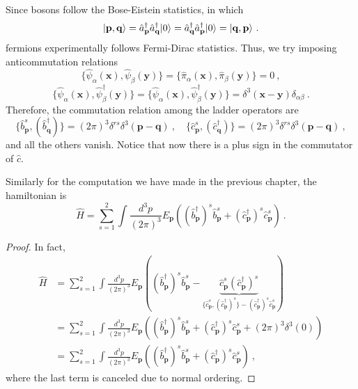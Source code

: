     Since bosons follow the Bose-Eistein statistics, in which 
    \begin{equation*}
        \vert\mathbf p, \mathbf q\rangle = \hat a^\dagger_{\mathbf p} \hat a^\dagger_{\mathbf q} \vert0\rangle = \hat a^\dagger_{\mathbf q} \hat a^\dagger_{\mathbf p} \vert0\rangle = \vert\mathbf q, \mathbf p\rangle ~.
    \end{equation*}
    fermions experimentally follows Fermi-Dirac statistics. Thus, we try imposing anticommutation relations 
    \begin{equation*}
        \{\hat \psi_\alpha (\mathbf x), \hat \psi_\beta (\mathbf y)\} = \{\hat \pi_\alpha (\mathbf x), \hat \pi_\beta (\mathbf y)\} = 0 ~,
    \end{equation*}
    \begin{equation*}
        \{\hat \psi_\alpha (\mathbf x), \hat \psi^\dagger_\beta (\mathbf y)\} = \{\hat \psi_\alpha (\mathbf x), \hat \psi^\dagger_\beta (\mathbf y)\} = \delta^3 (\mathbf x - \mathbf y) \delta_{\alpha\beta} ~.
    \end{equation*}
    Therefore, the commutation relation among the ladder operators are 
    \begin{equation*}
        \{\hat b^s_{\mathbf p}, (\hat b^\dagger_{\mathbf q})\} = (2\pi)^3 \delta^{rs} \delta^3 (\mathbf p - \mathbf q) ~, \quad \{\hat c^s_{\mathbf p}, (\hat c^\dagger_{\mathbf q})\} = (2\pi)^3 \delta^{rs} \delta^3 (\mathbf p - \mathbf q) ~, 
    \end{equation*}
    and all the others vanish. Notice that now there is a plus sign in the commutator of $\hat c$.

    Similarly for the computation we have made in the previous chapter, the hamiltonian is 
    \begin{equation*}
        \hat H = \sum_{s=1}^{2} \int \frac{d^3 p}{(2\pi)^3} E_{\mathbf p} ((\hat b^\dagger_{\mathbf p})^s \hat b^s_{\mathbf p} + (\hat c^\dagger_{\mathbf p})^s \hat c^s_{\mathbf p}) ~.
    \end{equation*}
    \begin{proof}
        In fact, 
        \begin{equation*}
        \begin{aligned}
            \hat H & = \sum_{s = 1}^{2} \int \frac{d^3 p}{(2\pi)^3} E_{\mathbf p} ((\hat b^\dagger_{\mathbf p})^s \hat b^s_{\mathbf p} - \underbrace{\hat c^s_{\mathbf p} (\hat c^\dagger_{\mathbf p})^s}_{\{\hat c^s_{\mathbf p}, (\hat c^\dagger_{\mathbf p})^s\} - (\hat c^\dagger_{\mathbf p})^s \hat c^s_{\mathbf p}} ) \\ & = \sum_{s=1}^{2} \int \frac{d^3 p}{(2\pi)^3} E_{\mathbf p} ((\hat b^\dagger_{\mathbf p})^s \hat b^s_{\mathbf p} + (\hat c^\dagger_{\mathbf p})^s \hat c^s_{\mathbf p} + (2\pi)^3 \delta^3 (0)) \\ & = \sum_{s=1}^{2} \int \frac{d^3 p}{(2\pi)^3} E_{\mathbf p} ((\hat b^\dagger_{\mathbf p})^s \hat b^s_{\mathbf p} + (\hat c^\dagger_{\mathbf p})^s \hat c^s_{\mathbf p}) ~,
        \end{aligned}
        \end{equation*}
        where the last term is canceled due to normal ordering.
    \end{proof}

